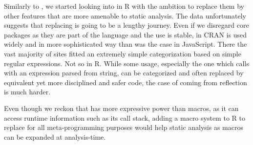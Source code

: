 \documentclass[review,screen,acmsmall,anonymous=true]{acmart}
\begin{document}
Similarly to \citep{ecoop11}, we started looking into \evals in R with the
ambition to replace them by other features that are more amenable to static
analysis. The data unfortunately suggests that replacing \eval is going to be
a lengthy journey. Even if we disregard core packages as they are part of the
language and the \eval use is stable, in CRAN \eval is used widely and in more
sophisticated way than was the case in JavaScript. There the vast majority of
sites fitted an extremely simple categorization based on simple regular
expressions. Not so in R. While some usage, especially the one which calls
\eval with an expression parsed from string, can be categorized and often
replaced by equivalent yet more disciplined and safer code, the case of \eval
coming from reflection is much harder. 

Even though we reckon that \eval has more expressive power than macros, as it can access runtime information such as its call stack, adding a macro system to R to replace \eval for all meta-programming purposes would help static analysis as macros can be expanded at analysis-time.



\end{document}
